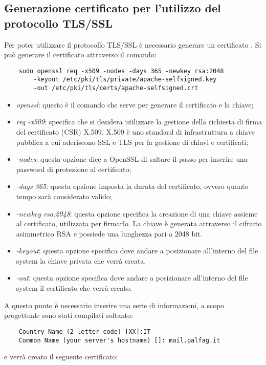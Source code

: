 \subsection{Generazione certificato per l'utilizzo del protocollo TLS/SSL}
Per poter utilizzare il protocollo TLS/SSL è necessario generare un certificato \cite{certs}.
Si può generare il certificato attraverso il comando:

\begin{verbatim}
    sudo openssl req -x509 -nodes -days 365 -newkey rsa:2048 
        -keyout /etc/pki/tls/private/apache-selfsigned.key 
        -out /etc/pki/tls/certs/apache-selfsigned.crt
\end{verbatim}

\begin{itemize}
    \item \textit{openssl}: questo è il comando che serve per generare il certificato e la chiave;
    \item \textit{req -x509}: specifica che si desidera utilizzare la gestione della richiesta di firma del certificato 
    (CSR) X.509. X.509 è uno standard di infrastruttura a chiave pubblica a cui aderiscono SSL e TLS per la gestione 
    di chiavi e certificati;
    \item \textit{-nodes}: questa opzione dice a OpenSSL di saltare il passo per inserire una password di protezione al certificato;
    \item \textit{-days 365}: questa opzione imposta la durata del certificato, ovvero quanto tempo sarà considerato
    valido;
    \item \textit{-newkey rsa:2048}: questa opzione specifica la creazione di una chiave assieme al certificato, 
    utilizzata per firmarlo. La chiave è generata attraverso il cifrario asimmetrico RSA 
    e possiede una lunghezza pari a 2048 bit.
    \item \textit{-keyout}: questa opzione specifica dove andare a posizionare all’interno del 
    file system la chiave privata che verrà creata.
    \item \textit{-out}: questa opzione specifica dove andare a posizionare all’interno del file system il certificato che verrà creato.
\end{itemize}
A questo punto è necessario inserire una serie di informazioni, a scopo progettuale sono stati compilati soltanto:

\begin{verbatim}
    Country Name (2 letter code) [XX]:IT
    Common Name (your server's hostname) []: mail.palfag.it
\end{verbatim}
e verrà creato il seguente certificato:

